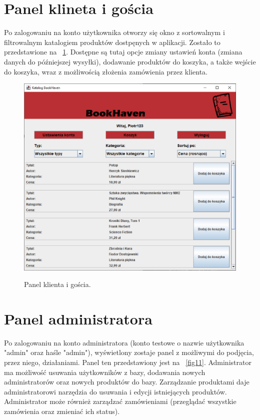 \section{Panel klineta i gościa}

Po zalogowaniu na konto użytkownika otworzy się okno z sortowalnym i filtrowalnym katalogiem produktów dostpęnych w aplikacji. Zostało to przedstawione
na \figurename~\ref{fig12}. Dostępne są tutaj opcje zmiany ustawień konta (zmiana danych do późniejszej wysyłki), dodawanie produktów do koszyka, a także
wejście do koszyka, wraz z możliwością złożenia zamówienia przez klienta.
\begin{figure}[H]
    \centering
    \includegraphics[width=\linewidth]{figures/fig_0012.eps}\\
    \caption{Panel klienta i gościa.\label{fig12}}
\end{figure}

\section{Panel administratora}

Po zalogowaniu na konto administratora (konto testowe o nazwie użytkownika "admin" oraz haśle "admin"), wyświetlony zostaje panel z możliwymi do podjęcia, przez niego, działaniami.
Panel ten przedstawiony jest na \figurename~\ref{fig11}. Administrator ma możliwość usuwania użytkowników z bazy, dodawania nowych administratorów oraz nowych produktów do bazy.
Zarządzanie produktami daje administratorowi narzędzia do usuwania i edycji istniejących produktów. Administrator może również zarządzać zamówieniami (przeglądać wszystkie zamówienia oraz zmieniać ich status).


